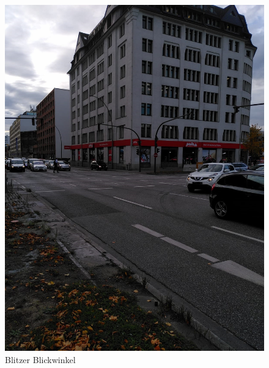 \begin{figure}[h]
\centering
\includegraphics[scale=0.2]{Sections/Brainstorming/Blickwinkel_Blitzer_2.jpeg}
\caption{Blitzer Blickwinkel}
\label{fig:Blitzer_Blickwinkel}
\end{figure}

\newpage

